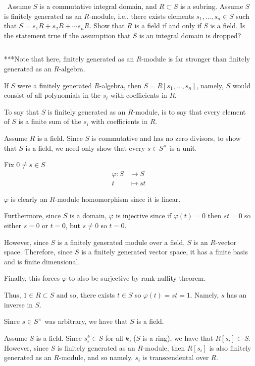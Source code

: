 \documentclass[12pt]{Qual}
\begin{document}
\begin{problem} $\,$
Assume $S$ is a commutative integral domain, and $R\subset S$ is a subring. Assume $S$ is finitely generated as an $R$-module, i.e., there exists elements $s_1,...,s_n\in S$ such that $S=s_1R+s_2R+\cdots s_nR$. Show that $R$ is a field if and only if $S$ is a field. Is the statement true if the assumption that $S$ is an integral domain is dropped?
\end{problem}


\begin{solution}$\,$
\begin{mybox}
***Note that here, finitely generated as an $R$-module is far stronger than finitely generated as an $R$-algebra.

If $S$ were a finitely generated $R$-algebra, then $S=R[s_1,...,s_n]$, namely, $S$ would consist of all polynomials in the $s_i$ with coefficients in $R$.

To say that $S$ is finitely generated as an $R$-module, is to say that every element of $S$ is a finite sum of the $s_i$ with coefficients in $R$.
\end{mybox}

\boxed{\implies} Assume $R$ is a field. Since $S$ is commutative and has no zero divisors, to show that $S$ is a field, we need only show that every $s\in S^\times$ is a unit.

Fix $0\not=s\in S$ \begin{align*}
    \varphi:S&\to S\\
    t&\mapsto st
\end{align*}

$\varphi$ is clearly an $R$-module homomorphism since it is linear.

Furthermore, since $S$ is a domain, $\varphi$ is injective since if $\varphi(t)=0$ then $st=0$ so either $s=0$ or $t=0$, but $s\not=0$ so $t=0$.

However, since $S$ is a finitely generated module over a field, $S$ is an $R$-vector space. Therefore, since $S$ is a finitely generated vector space, it has a finite basis and is finite dimensional.

Finally, this forces $\varphi$ to also be surjective by rank-nullity theorem.

Thus, $1\in R\subset S$ and so, there exists $t\in S$ so $\varphi(t)=st=1.$ Namely, $s$ has an inverse in $S.$

Since $s\in S^\times$ was arbitrary, we have that $S$ is a field.

\boxed{\impliedby} Assume $S$ is a field. Since $s_i^k\in S$ for all $k$, ($S$ is a ring), we have that $R[s_i]\subset S$. However, since $S$ is finitely generated as an $R$-module, then $R[s_i]$ is also finitely generated as an $R$-module, and so namely, $s_i$ is transcendental over $R$.


\end{solution}
\end{document}
